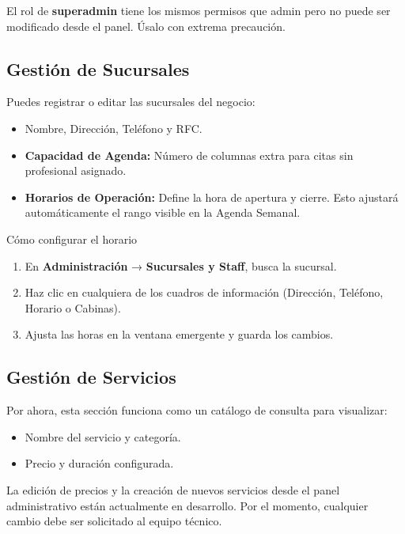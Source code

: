 \documentclass[12pt,a4paper]{article}
\begin{document}
\begin{alertabox}
El rol de \textbf{superadmin} tiene los mismos permisos que admin pero no puede ser modificado desde el panel. Úsalo con extrema precaución.
\end{alertabox}

\subsection{Gestión de Sucursales}

Puedes registrar o editar las sucursales del negocio:
\begin{itemize}[leftmargin=*]
  \item Nombre, Dirección, Teléfono y RFC.
  \item \textbf{Capacidad de Agenda:} Número de columnas extra para citas sin profesional asignado.
  \item \textbf{Horarios de Operación:} Define la hora de apertura y cierre. Esto ajustará automáticamente el rango visible en la Agenda Semanal.
\end{itemize}

\begin{pasobox}{Cómo configurar el horario}
\begin{enumerate}[leftmargin=*]
  \item En \textbf{Administración} → \textbf{Sucursales y Staff}, busca la sucursal.
  \item Haz clic en cualquiera de los cuadros de información (Dirección, Teléfono, Horario o Cabinas).
  \item Ajusta las horas en la ventana emergente y guarda los cambios.
\end{enumerate}
\end{pasobox}

\subsection{Gestión de Servicios }

Por ahora, esta sección funciona como un catálogo de consulta para visualizar:
\begin{itemize}[leftmargin=*]
  \item Nombre del servicio y categoría.
  \item Precio y duración configurada.
\end{itemize}

\begin{alertabox}
La edición de precios y la creación de nuevos servicios desde el panel administrativo están actualmente en desarrollo. Por el momento, cualquier cambio debe ser solicitado al equipo técnico.
\end{alertabox}
\end{document}
